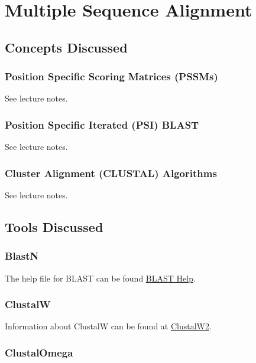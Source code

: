 
\chapter{Multiple Sequence Alignment} 

\label{Chapter4} 

\section{Concepts Discussed}

    \subsection{Position Specific Scoring Matrices (PSSMs)}

    See lecture notes.\autocite{T4}

    \subsection{Position Specific Iterated (PSI) BLAST}

    See lecture notes.\autocite{T4}
    
    \subsection{Cluster Alignment (CLUSTAL) Algorithms}

    See lecture notes.\autocite{T4}

\section{Tools Discussed}

    \subsection{BlastN}

    The help file for BLAST can be found \href{https://blast.ncbi.nlm.nih.gov/Blast.cgi?CMD=Web\&PAGE_TYPE=BlastDocs\&DOC_TYPE=BlastHelp}{BLAST Help}.

    \subsection{ClustalW}

    Information about ClustalW can be found at \href{https://www.ebi.ac.uk/Tools/msa/clustalw2/help/index.html}{ClustalW2}.

    \subsection{ClustalOmega}


